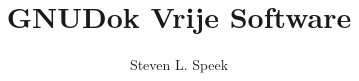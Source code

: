 \documentclass[12pt,a4paper]{article}
\begin{document}
\title{GNUDok Vrije Software}
\author{Steven L. Speek}
\maketitle

\end{document}
